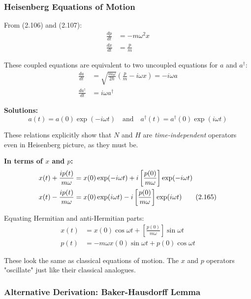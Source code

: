 \documentclass[11pt,a4paper]{article}
\begin{document}
\subsubsection{Heisenberg Equations of Motion}

From (2.106) and (2.107):
\begin{align}
\frac{dp}{dt} &= -m\omega^2 x \tag{2.162a} \\
\frac{dx}{dt} &= \frac{p}{m} \tag{2.162b}
\end{align}

These coupled equations are equivalent to two uncoupled equations for $a$ and $a^\dagger$:
\begin{align}
\frac{da}{dt} &= \sqrt{\frac{m\omega}{2\hbar}}\left(\frac{p}{m} - i\omega x\right) = -i\omega a \tag{2.163a} \\
\frac{da^\dagger}{dt} &= i\omega a^\dagger \tag{2.163b}
\end{align}

\textbf{Solutions:}
\begin{equation}
\boxed{a(t) = a(0)\exp(-i\omega t) \quad \text{and} \quad a^\dagger(t) = a^\dagger(0)\exp(i\omega t)}
\tag{2.164}
\end{equation}

These relations explicitly show that $N$ and $H$ are \textit{time-independent} operators even in Heisenberg picture, as they must be.

\textbf{In terms of $x$ and $p$:}
\begin{align}
x(t) + \frac{ip(t)}{m\omega} &= x(0)\exp(-i\omega t) + i\left[\frac{p(0)}{m\omega}\right]\exp(-i\omega t) \notag \\
x(t) - \frac{ip(t)}{m\omega} &= x(0)\exp(i\omega t) - i\left[\frac{p(0)}{m\omega}\right]\exp(i\omega t)
\tag{2.165}
\end{align}

Equating Hermitian and anti-Hermitian parts:
\begin{align}
x(t) &= x(0)\cos\omega t + \left[\frac{p(0)}{m\omega}\right]\sin\omega t \tag{2.166a} \\
p(t) &= -m\omega x(0)\sin\omega t + p(0)\cos\omega t \tag{2.166b}
\end{align}

These look the same as classical equations of motion. The $x$ and $p$ operators "oscillate" just like their classical analogues.

\subsubsection{Alternative Derivation: Baker-Hausdorff Lemma}
\end{document}
